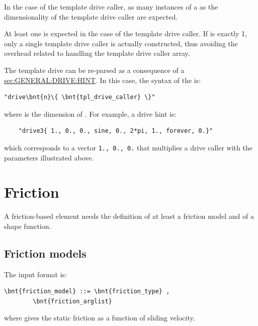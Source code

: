 In the case of the  template drive caller,
as many instances of a  as the dimensionality
of the template drive caller are expected.

At least one  is expected in the case of the 
template drive caller. 
If  is exactly 1, only a single
template drive caller is actually constructed, thus avoiding the overhead 
related to handling the template drive caller array.    

The template drive can be re-parsed as a consequence of a
\hyperref{\kw{hint}}{\kw{hint} (see Section~}{)}{sec:GENERAL:DRIVE:HINT}.
In this case, the syntax of the  is:
\begin{Verbatim}[commandchars=\\\{\}]
    "drive\bnt{n}\{ \bnt{tpl_drive_caller} \}"
\end{Verbatim}
where  is the dimension of .
For example, a  drive hint is:
\begin{verbatim}
    "drive3{ 1., 0., 0., sine, 0., 2*pi, 1., forever, 0.}"
\end{verbatim}
which corresponds to a vector \texttt{1., 0., 0.} that multiplies
a  drive caller with the parameters illustrated above.






\section{Friction}
A friction-based element needs the definition of
at least a friction model and of a shape function.

\subsection{Friction models}
The  input format is:
\begin{Verbatim}[commandchars=\\\{\}]
    \bnt{friction_model} ::= \bnt{friction_type} ,
        \bnt{friction_arglist}
\end{Verbatim}
where  gives the static friction
as a function of sliding velocity.

